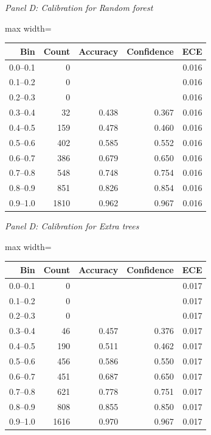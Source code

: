 \endgroup
\par\medskip\noindent\textit{Panel D: Calibration for Random forest}\par
\begingroup
\scriptsize
\setlength{\tabcolsep}{3pt}
\begin{center}
\begin{adjustbox}{max width=\linewidth}
\begin{tabular}{rrrrr}
\toprule
Bin & Count & Accuracy & Confidence & ECE \\
\midrule
0.0--0.1 & 0 &  &  & 0.016 \\
0.1--0.2 & 0 &  &  & 0.016 \\
0.2--0.3 & 0 &  &  & 0.016 \\
0.3--0.4 & 32 & 0.438 & 0.367 & 0.016 \\
0.4--0.5 & 159 & 0.478 & 0.460 & 0.016 \\
0.5--0.6 & 402 & 0.585 & 0.552 & 0.016 \\
0.6--0.7 & 386 & 0.679 & 0.650 & 0.016 \\
0.7--0.8 & 548 & 0.748 & 0.754 & 0.016 \\
0.8--0.9 & 851 & 0.826 & 0.854 & 0.016 \\
0.9--1.0 & 1810 & 0.962 & 0.967 & 0.016 \\
\bottomrule
\end{tabular}
\end{adjustbox}
\end{center}
\endgroup
\par\medskip\noindent\textit{Panel D: Calibration for Extra trees}\par
\begingroup
\scriptsize
\setlength{\tabcolsep}{3pt}
\begin{center}
\begin{adjustbox}{max width=\linewidth}
\begin{tabular}{rrrrr}
\toprule
Bin & Count & Accuracy & Confidence & ECE \\
\midrule
0.0--0.1 & 0 &  &  & 0.017 \\
0.1--0.2 & 0 &  &  & 0.017 \\
0.2--0.3 & 0 &  &  & 0.017 \\
0.3--0.4 & 46 & 0.457 & 0.376 & 0.017 \\
0.4--0.5 & 190 & 0.511 & 0.462 & 0.017 \\
0.5--0.6 & 456 & 0.586 & 0.550 & 0.017 \\
0.6--0.7 & 451 & 0.687 & 0.650 & 0.017 \\
0.7--0.8 & 621 & 0.778 & 0.751 & 0.017 \\
0.8--0.9 & 808 & 0.855 & 0.850 & 0.017 \\
0.9--1.0 & 1616 & 0.970 & 0.967 & 0.017 \\
\bottomrule
\end{tabular}
\end{adjustbox}
\end{center}
